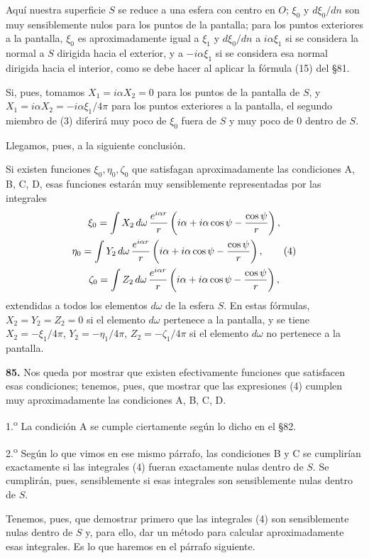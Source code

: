 Aquí nuestra superficie $S$ se reduce a una esfera con centro en $O$;
$\xi_0$ y $d\xi_0/dn$ son muy sensiblemente nulos para los puntos de la
pantalla; para los puntos exteriores a la pantalla, $\xi_0$ es
aproximadamente igual a $\xi_1$ y $d\xi_0/dn$ a $i\alpha\xi_1$ si se
considera la normal a $S$ dirigida hacia el exterior, y a $-i\alpha\xi_1$
si se considera esa normal dirigida hacia el interior, como se debe hacer
al aplicar la fórmula (15) del §81.

Si, pues, tomamos $X_1=i\alpha X_2=0$ para los puntos de la pantalla de
$S$, y $X_1=i\alpha X_2=-i\alpha\xi_1/4\pi$ para los puntos exteriores a
la pantalla, el segundo miembro de (3) diferirá muy poco de $\xi_0$ fuera
de $S$ y muy poco de $0$ dentro de $S$.

Llegamos, pues, a la siguiente conclusión.

Si existen funciones $\xi_0,\eta_0,\zeta_0$ que satisfagan
aproximadamente las condiciones A, B, C, D, esas funciones estarán muy
sensiblemente representadas por las integrales
\begin{gather}
\xi_0=\int X_2\,d\omega\,\frac{e^{i\alpha r}}{r}
\left(i\alpha+i\alpha\cos\psi-\frac{\cos\psi}{r}\right),\notag\\
\eta_0=\int Y_2\,d\omega\,\frac{e^{i\alpha r}}{r}
\left(i\alpha+i\alpha\cos\psi-\frac{\cos\psi}{r}\right),\tag{4}\\
\zeta_0=\int Z_2\,d\omega\,\frac{e^{i\alpha r}}{r}
\left(i\alpha+i\alpha\cos\psi-\frac{\cos\psi}{r}\right),\notag
\end{gather}
extendidas a todos los elementos $d\omega$ de la esfera $S$. En estas
fórmulas, $X_2=Y_2=Z_2=0$ si el elemento $d\omega$ pertenece a la
pantalla, y se tiene $X_2=-\xi_1/4\pi$, $Y_2=-\eta_1/4\pi$,
$Z_2=-\zeta_1/4\pi$ si el elemento $d\omega$ no pertenece a la pantalla.

\noindent\textbf{85.} Nos queda por mostrar que existen efectivamente funciones que satisfacen
esas condiciones; tenemos, pues, que mostrar que las expresiones (4)
cumplen muy aproximadamente las condiciones A, B, C, D.

1.\textsuperscript{o} La condición A se cumple ciertamente según lo dicho en el §82.

2.\textsuperscript{o} Según lo que vimos en ese mismo párrafo, las condiciones B y C
se cumplirían exactamente si las integrales (4) fueran exactamente nulas
dentro de $S$. Se cumplirán, pues, sensiblemente si esas integrales son
sensiblemente nulas dentro de $S$.

Tenemos, pues, que demostrar primero que las integrales (4) son
sensiblemente nulas dentro de $S$ y, para ello, dar un método para
calcular aproximadamente esas integrales. Es lo que haremos en el párrafo
siguiente.

